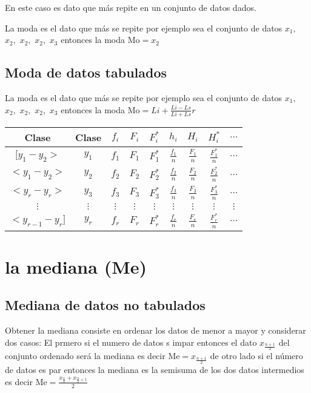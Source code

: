\documentclass[10pt,]{krantz}
\theoremstyle{definition}
\theoremstyle{definition}
\theoremstyle{definition}
\theoremstyle{remark}
\begin{document}
En este caso es dato que más repite en un conjunto de datos dados.

La moda es el dato que más se repite por ejemplo sea el conjunto de datos \(x_1,\) \(x_2,\) \(x_2,\) \(x_2,\) \(x_3\) entonces la moda \(\text{Mo}=x_2\)

\hypertarget{moda-de-datos-tabulados}{%
\subsection{Moda de datos tabulados}\label{moda-de-datos-tabulados}}

La moda es el dato que más se repite por ejemplo sea el conjunto de datos \(x_1,\) \(x_2,\) \(x_2,\) \(x_2,\) \(x_3\) entonces la moda \(\text{Mo}=Li+\frac{Li-Ls}{Li+Ls}r\)

\begin{longtable}[]{@{}ccccccccc@{}}
\toprule
Clase & Clase & \(f_i\) & \(F_i\) & \(F_i^*\) & \(h_i\) & \(H_i\) & \(H_i^*\) & \(\ldots\)\tabularnewline
\midrule
\endhead
\([y_1-y_2>\) & \(y_1\) & \(f_1\) & \(F_1\) & \(F_1^*\) & \(\frac{f_1}{n}\) & \(\frac{F_1}{n}\) & \(\frac{F_1^*}{n}\) & \(\ldots\)\tabularnewline
\(<y_1-y_2>\) & \(y_2\) & \(f_2\) & \(F_2\) & \(F_2^*\) & \(\frac{f_2}{n}\) & \(\frac{F_2}{n}\) & \(\frac{F_2^*}{n}\) & \(\ldots\)\tabularnewline
\(<y_{r}-y_r>\) & \(y_3\) & \(f_3\) & \(F_3\) & \(F_3^*\) & \(\frac{f_3}{n}\) & \(\frac{F_3}{n}\) & \(\frac{F_3^*}{n}\) & \(\ldots\)\tabularnewline
\(\vdots\) & \(\vdots\) & \(\vdots\) & \(\vdots\) & \(\vdots\) & \(\vdots\) & \(\vdots\) & \(\vdots\) & \(\vdots\)\tabularnewline
\(<y_{r-1}-y_r]\) & \(y_r\) & \(f_r\) & \(F_r\) & \(F_r^*\) & \(\frac{f_r}{n}\) & \(\frac{F_r}{n}\) & \(\frac{F_r^*}{n}\) & \(...\)\tabularnewline
\bottomrule
\end{longtable}

\hypertarget{la-mediana-me}{%
\section{la mediana (Me)}\label{la-mediana-me}}

\hypertarget{mediana-de-datos-no-tabulados}{%
\subsection{Mediana de datos no tabulados}\label{mediana-de-datos-no-tabulados}}

Obtener la mediana consiste en ordenar los datos de menor a mayor y considerar dos casos: El prmero si el numero de datos s impar entonces el dato \(x_{\frac{n+1}{2}}\) del conjunto ordenado será la mediana es decir \(\text{Me}=x_{\frac{n+1}{2}}\) de otro lado si el número de datos es par entonces la mediana es la semisuma de los dos datos intermedios es decir \(\text{Me}=\frac{x_{\frac{n}{2}}+x_{\frac{n}{2}+1}}{2}\)
\end{document}
